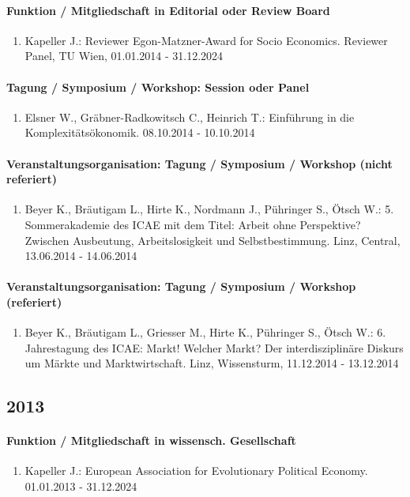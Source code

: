 \paragraph{Funktion / Mitgliedschaft in Editorial oder Review Board}
\begin{enumerate}[leftmargin=*, labelsep=0.5cm]
\item Kapeller J.: Reviewer Egon-Matzner-Award for Socio Economics. Reviewer Panel, TU Wien, 01.01.2014 - 31.12.2024
\end{enumerate}
\paragraph{Tagung / Symposium / Workshop: Session oder Panel}
\begin{enumerate}[leftmargin=*, labelsep=0.5cm]
\item Elsner W., Gräbner-Radkowitsch C., Heinrich T.: Einführung in die Komplexitätsökonomik. 08.10.2014 - 10.10.2014
\end{enumerate}
\paragraph{Veranstaltungsorganisation: Tagung / Symposium / Workshop (nicht referiert)}
\begin{enumerate}[leftmargin=*, labelsep=0.5cm]
\item Beyer K., Bräutigam L., Hirte K., Nordmann J., Pühringer S., Ötsch W.: 5. Sommerakademie des ICAE mit dem Titel: Arbeit ohne Perspektive? Zwischen Ausbeutung, Arbeitslosigkeit und Selbstbestimmung. Linz, Central, 13.06.2014 - 14.06.2014
\end{enumerate}
\paragraph{Veranstaltungsorganisation: Tagung / Symposium / Workshop (referiert)}
\begin{enumerate}[leftmargin=*, labelsep=0.5cm]
\item Beyer K., Bräutigam L., Griesser M., Hirte K., Pühringer S., Ötsch W.: 6. Jahrestagung des ICAE: Markt! Welcher Markt? Der interdisziplinäre Diskurs um Märkte und Marktwirtschaft. Linz, Wissensturm, 11.12.2014 - 13.12.2014
\end{enumerate}\subsection*{2013}\paragraph{Funktion / Mitgliedschaft in wissensch. Gesellschaft}
\begin{enumerate}[leftmargin=*, labelsep=0.5cm]
\item Kapeller J.: European Association for Evolutionary Political Economy. 01.01.2013 - 31.12.2024
\end{enumerate}
